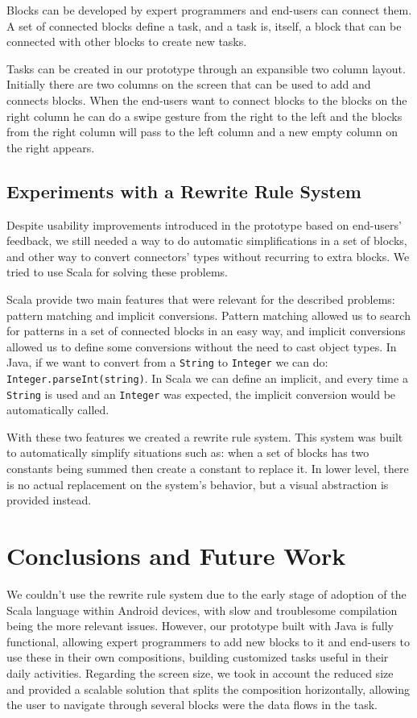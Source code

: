 \documentclass[9pt,a4paper]{extarticle}
\begin{document}
\begin{multicols}{2}
Blocks can be developed by expert programmers and end-users can connect them. A set of connected blocks define a task, and a task is, itself, a block that can be connected with other blocks to create new tasks.

Tasks can be created in our prototype through an expansible two column layout. Initially there are two columns on the screen that can be used to add and connects blocks. When the end-users want to connect blocks to the blocks on the right column he can do a swipe gesture from the right to the left and the blocks from the right column will pass to the left column and a new empty column on the right appears.

\subsection{Experiments with a Rewrite Rule System}

Despite usability improvements introduced in the prototype based on end-users' feedback, we still needed a way to do automatic simplifications in a set of blocks, and other way to convert connectors' types without recurring
to extra blocks. We tried to use Scala for solving these problems.

Scala provide two main features that were relevant for the described problems: pattern matching and implicit conversions. Pattern matching allowed us to search for patterns in a set of connected blocks in an easy way, and implicit conversions allowed us to define some conversions without the need to cast object types. In Java, if we want to convert from a \texttt{String} to \texttt{Integer} we can do: \texttt{Integer.parseInt(string)}. In Scala we can define an implicit,
and every time a \texttt{String} is used and an \texttt{Integer} was expected, the implicit conversion would be automatically called.

With these two features we created a rewrite rule system. This system was built to automatically simplify situations such as: when a set of blocks has two constants being summed then create a constant to replace it. In lower level, there is no actual replacement on the system's behavior, but a visual abstraction is provided instead. 

\section{Conclusions and Future Work}\label{sec:conclui}

We couldn't use the rewrite rule system due to the early stage of adoption of the Scala language within Android devices, with slow and troublesome compilation being the more relevant issues. However, our prototype built with Java is fully functional, allowing expert programmers to add new blocks to it and end-users to use these in their own compositions, building customized tasks useful in their daily activities. Regarding the screen size, we took in account the reduced size and provided a scalable solution that splits the composition horizontally, allowing the user to navigate through several blocks were the data flows in the task. 


\end{multicols}
\end{document}
